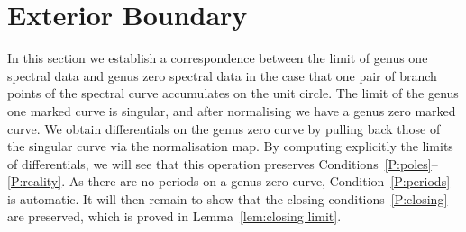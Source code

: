 %
%
%







\section{Exterior Boundary}
\label{sec:Exterior}

In this section we establish a correspondence between the limit of genus one spectral data and genus zero spectral data in the case that one pair of branch points of the spectral curve accumulates on the unit circle. The limit of the genus one marked curve is singular, and after normalising we have a genus zero marked curve. We obtain differentials on the genus zero curve by pulling back those of the singular curve via the normalisation map. By computing explicitly the limits of differentials, we will see that this operation preserves Conditions~\ref{P:poles}--\ref{P:reality}. As there are no periods on a genus zero curve, Condition~\ref{P:periods} is automatic. It will then remain to show that the closing conditions~\ref{P:closing} are preserved, which is proved in Lemma~\ref{lem:closing limit}.

